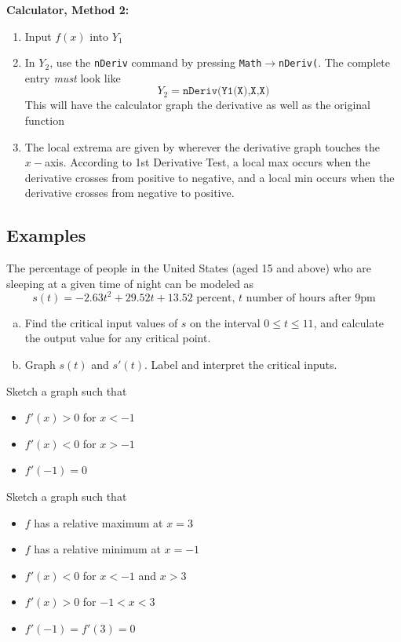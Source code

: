 \documentclass[notes]{subfiles}
\begin{document}
		\textbf{Calculator, Method 2:}
			\begin{enumerate}
				\item Input $f(x)$ into $Y_1$
				\item In $Y_2$, use the \texttt{nDeriv} command by pressing \texttt{Math$\to$nDeriv(}.  The complete entry \emph{must} look like
\[Y_2 = \texttt{nDeriv(Y1(X),X,X)}\]
					This will have the calculator graph the derivative as well as the original function
				\item The local extrema are given by wherever the derivative graph touches the $x-$axis.  According to 1st Derivative Test, a local max occurs when the derivative crosses from positive to negative, and a local min occurs when the derivative crosses from negative to positive.
			\end{enumerate}
	
	\subsection*{Examples}
		\begin{ex}
			The percentage of people in the United States (aged 15 and above) who are sleeping at a given time of night can be modeled as 
				\[s(t) = -2.63t^2 + 29.52t + 13.52\text{ percent, }t\text{ number of hours after 9pm}\]
				\begin{enumerate}[(a)]
					\item Find the critical input values of $s$ on the interval $0\leq t\leq 11$, and calculate the output value for any critical point.
					\item Graph $s(t)$ and $s'(t)$.  Label and interpret the critical inputs.
				\end{enumerate}
		\end{ex}
			
		\begin{ex} Sketch a graph such that 
			\begin{itemize}
				\item $f'(x) > 0$ for $x < -1$
				\item $f'(x) < 0$ for $x > -1$
				\item $f'(-1) = 0$
			\end{itemize}
		\end{ex}
			\vs{1}
			\newpage
			
		\begin{ex} Sketch a graph such that
			\begin{itemize}
				\item $f$ has a relative maximum at $x = 3$
				\item $f$ has a relative minimum at $x = -1$
				\item $f'(x) < 0$ for $x < -1$ and $x > 3$
				\item $f'(x) > 0$ for $-1 < x < 3$
				\item $f'(-1) = f'(3) = 0$
			\end{itemize}
		\end{ex}
			
\end{document}
